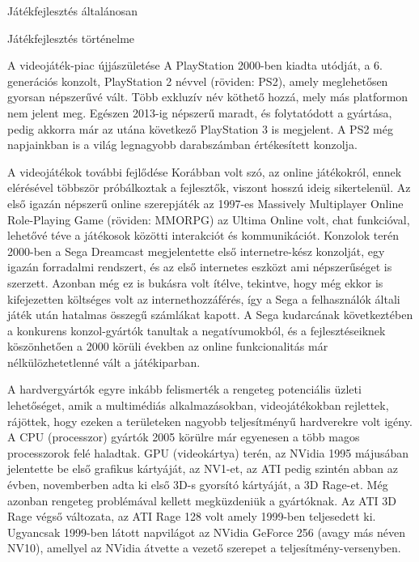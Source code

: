 \begin{MyChapter}{Játékfejlesztés általánosan}
\begin{MySection}{Játékfejlesztés történelme}
\begin{MySubSection}{A videojáték-piac újjászületése}
		A PlayStation 2000-ben kiadta utódját, a 6. generációs konzolt, PlayStation 2 névvel (röviden: PS2), amely meglehetősen gyorsan népszerűvé vált. Több exkluzív név köthető hozzá, mely más platformon nem jelent meg. Egészen 2013-ig népszerű maradt, és folytatódott a gyártása, pedig akkorra már az utána következő PlayStation 3 is megjelent. A PS2 még napjainkban is a világ legnagyobb darabszámban értékesített konzolja.
		
		\end{MySubSection}
		
		\begin{MySubSection}{A videojátékok további fejlődése}
		Korábban volt szó, az online játékokról, ennek elérésével többször próbálkoztak a fejlesztők, viszont hosszú ideig sikertelenül. Az első igazán népszerű online szerepjáték az 1997-es Massively Multiplayer Online Role-Playing Game (röviden: MMORPG) az Ultima Online volt, chat funkcióval, lehetővé téve a játékosok közötti interakciót és kommunikációt. Konzolok terén 2000-ben a Sega Dreamcast megjelentette első internetre-kész konzolját, egy igazán forradalmi rendszert, és az első internetes eszközt ami népszerűséget is szerzett. Azonban még ez is bukásra volt ítélve, tekintve, hogy még ekkor is kifejezetten költséges volt az internethozzáférés, így a Sega a felhasználók általi játék után hatalmas összegű számlákat kapott. A Sega kudarcának következtében a konkurens konzol-gyártók tanultak a negatívumokból, és a fejlesztéseiknek köszönhetően a 2000 körüli években az online funkcionalitás már nélkülözhetetlenné vált a játékiparban.
		
		A hardvergyártók egyre inkább felismerték a rengeteg potenciális üzleti lehetőséget, amik a multimédiás alkalmazásokban, videojátékokban rejlettek, rájöttek, hogy ezeken a területeken nagyobb teljesítményű hardverekre volt igény.
		A CPU (processzor) gyártók 2005 körülre már egyenesen a több magos processzorok felé haladtak. 
		GPU (videokártya) terén, az NVidia 1995 májusában jelentette be első grafikus kártyáját, az NV1-et, az ATI pedig szintén abban az évben, novemberben adta ki első 3D-s gyorsító kártyáját, a 3D Rage-et. Még azonban rengeteg problémával kellett megküzdeniük a gyártóknak. Az ATI 3D Rage végső változata, az ATI Rage 128 volt amely 1999-ben teljesedett ki. Ugyancsak 1999-ben látott napvilágot az NVidia GeForce 256 (avagy más néven NV10), amellyel az NVidia átvette a vezető szerepet a teljesítmény-versenyben.
		

\end{MySubSection}
\end{MySection}
\end{MyChapter}

